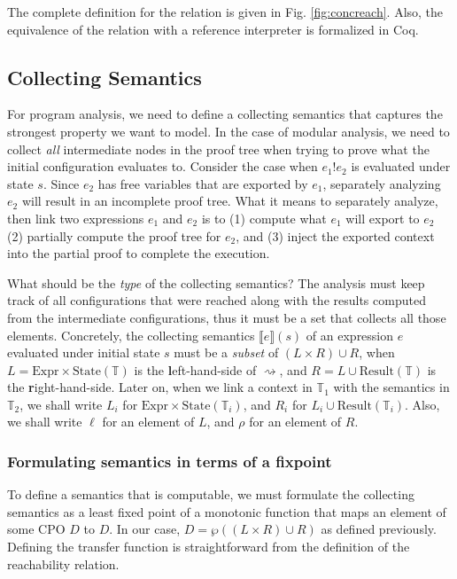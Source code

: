 \documentclass[acmsmall,review]{acmart}\settopmatter{printfolios=true,printccs=false,printacmref=false}
\theoremstyle{definition}
\newcommand*{\Expr}{\text{Expr}}
\newcommand*{\Time}{\mathbb{T}}
\newcommand*{\State}[1]{\text{State}({#1})}
\newcommand*{\Result}[1]{\text{Result}({#1})}
\newcommand*{\link}[2]{{#1}\mathtt{!}{#2}}
\newcommand*{\sembracket}[1]{\lBrack{#1}\rBrack}
\begin{document}
The complete definition for the relation is given in Fig. \ref{fig:concreach}.
Also, the equivalence of the relation with a reference interpreter is formalized in Coq.

\subsection{Collecting Semantics}

For program analysis, we need to define a collecting semantics that captures the strongest property we want to model.
In the case of modular analysis, we need to collect \emph{all} intermediate nodes in the proof tree when trying to prove what the initial configuration evaluates to.
Consider the case when $\link{e_1}{e_2}$ is evaluated under state $s$.
Since $e_2$ has free variables that are exported by $e_1$, separately analyzing $e_2$ will result in an incomplete proof tree.
What it means to separately analyze, then link two expressions $e_1$ and $e_2$ is to (1) compute what $e_1$ will export to $e_2$ (2) partially compute the proof tree for $e_2$, and (3) inject the exported context into the partial proof to complete the execution.

What should be the \emph{type} of the collecting semantics?
The analysis must keep track of all configurations that were reached along with the results computed from the intermediate configurations, thus it must be a set that collects all those elements.
Concretely, the collecting semantics $\sembracket{e}(s)$ of an expression $e$ evaluated under initial state $s$ must be a \emph{subset} of $(L\times R)\cup R$, when $L=\Expr\times\State{\Time}$ is the \textbf{l}eft-hand-side of $\rightsquigarrow$, and $R=L\cup\Result{\Time}$ is the \textbf{r}ight-hand-side.
Later on, when we link a context in $\Time_1$ with the semantics in $\Time_2$, we shall write $L_i$ for $\Expr\times\State{\Time_i}$, and $R_i$ for $L_i\cup\Result{\Time_i}$.
Also, we shall write $\ell$ for an element of $L$, and $\rho$ for an element of $R$.

\subsubsection{Formulating semantics in terms of a fixpoint}

To define a semantics that is computable, we must formulate the collecting semantics as a least fixed point of a monotonic function that maps an element of some CPO $D$ to $D$.
In our case, $D=\wp((L\times R)\cup R)$ as defined previously.
Defining the transfer function is straightforward from the definition of the reachability relation.
\end{document}

